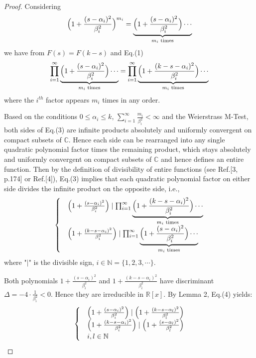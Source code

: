 \documentclass[12pt]{article}
\begin{document}
\begin{proof}
Considering \begin{equation}\nonumber\Big{(}1+\frac{(s-\alpha_i)^2}{\beta_i^2}\Big{)}^{m_{i}}=\underbrace{\Big{(}1+\frac{(s-\alpha_i)^2}{\beta_i^2}\Big{)}\cdots }_{m_i \text{ times}}\end{equation}
we have from $F(s)=F(k-s)$ and Eq.(1)
\begin{equation}
\prod_{i=1}^{\infty}\underbrace{\Big{(}1+\frac{(s-\alpha_i)^2}{\beta_i^2}\Big{)}\cdots }_{m_i \text{ times}}=\prod_{i=1}^{\infty}\underbrace{\Big{(}1+\frac{(k-s-\alpha_i)^2}{\beta_i^2}\Big{)}\cdots }_{m_i \text{ times}}
\end{equation}
where the $i^{th}$ factor appears $m_i$ times in any order.

Based on the conditions $0\leq\alpha_i\leq k$, $\sum_{i=1}^{\infty}\frac{m_i}{\beta_i^2}<\infty$ and the Weierstrass M-Test, both sides of Eq.(3) are infinite products absolutely and uniformly convergent on compact subsets of $\mathbb{C}$. Hence each side can be rearranged into any single quadratic polynomial factor times the remaining product, which stays absolutely and uniformly convergent on compact subsets of $\mathbb{C}$ and hence defines an entire function. Then by the definition of divisibility of entire functions (see Ref.[3, p.174] or Ref.[4]), Eq.(3) implies that each quadratic polynomial factor on either side divides the infinite product on the opposite side, i.e.,
 \begin{equation}
 \begin{cases}& \Big{(}1+\frac{(s-\alpha_i)^2}{\beta_i^2}\Big{)}\mid \prod_{i=1}^{\infty}\underbrace{\Big{(}1+\frac{(k-s-\alpha_i)^2}{\beta_i^2}\Big{)}\cdots }_{m_i \text{ times}}\\
 &\Big{(}1+\frac{(k-s-\alpha_i)^2}{\beta_i^2}\Big{)}\mid \prod_{i=1}^{\infty}\underbrace{\Big{(}1+\frac{(s-\alpha_i)^2}{\beta_i^2}\Big{)}\cdots }_{m_i \text{ times}}\\
 \end{cases}
 \end{equation}
 where "$\mid$" is the divisible sign, $i\in\mathbb{N}=\{1, 2, 3, \cdots\}$.

 Both polynomials $1+\frac{(s-\alpha_i)^2}{\beta_i^2}$ and $1+\frac{(k-s-\alpha_i)^2}{\beta_i^2}$ have discriminant $\Delta=-4\cdot\frac{1}{\beta_i^2}< 0$. Hence they are irreducible in $\mathbb{R}[x]$. By Lemma 2, Eq.(4) yields:
\begin{equation}\begin{cases}&\Big{(}1+\frac{(s-\alpha_i)^2}{\beta_i^2}\Big{)}\mid \Big{(}1+\frac{(k-s-\alpha_l)^2}{\beta_l^2}\Big{)}\\
 &\Big{(}1+\frac{(k-s-\alpha_i)^2}{\beta_i^2}\Big{)}\mid \Big{(}1+\frac{(s-\alpha_l)^2}{\beta_l^2}\Big{)}\\
 & i, l\in\mathbb{N}
 \end{cases}\end{equation}


\end{proof}
\end{document}
